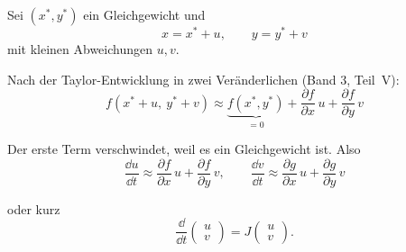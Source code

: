 \begin{merksatz}
Sei $(x^{*}, y^{*})$ ein Gleichgewicht und
\[ x = x^{*} + u, \qquad y = y^{*} + v \]
mit kleinen Abweichungen $u, v$.

Nach der Taylor-Entwicklung in zwei Veränderlichen (Band 3, Teil~V):
\[ f(x^{*}+u,\ y^{*}+v) \approx \underbrace{f(x^{*},y^{*})}_{= 0} + \frac{\partial f}{\partial x}\,u + \frac{\partial f}{\partial y}\,v \]

Der erste Term verschwindet, weil es ein Gleichgewicht ist. Also
\[ \frac{\dd u}{\dd t} \approx \frac{\partial f}{\partial x}\,u + \frac{\partial f}{\partial y}\,v , \qquad \frac{\dd v}{\dd t} \approx \frac{\partial g}{\partial x}\,u + \frac{\partial g}{\partial y}\,v \]

oder kurz
\[ \frac{\dd}{\dd t}\begin{pmatrix}u\\v\end{pmatrix} = J\begin{pmatrix}u\\v\end{pmatrix} . \]

\begin{center}
\begin{minipage}{0.88\textwidth}
\end{minipage}
\end{center}
\end{merksatz}

